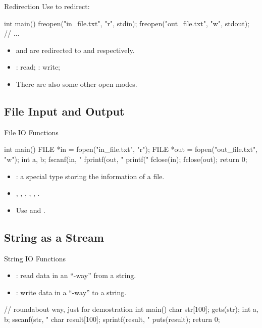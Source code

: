 \documentclass{beamer}
\begin{document}
\begin{frame}[fragile]{Redirection}
    Use  to redirect:
    \begin{cpp}
int main() {
  freopen("in_file.txt", "r", stdin);
  freopen("out_file.txt", "w", stdout);
  // ...
}
    \end{cpp}
    \pause
    \begin{itemize}
        \item {} and  are redirected to  and  respectively.
        \item {}: read; : write;
        \item There are also some other open modes.
    \end{itemize}
\end{frame}

\subsection{File Input and Output}

\begin{frame}[fragile]{File IO Functions}
    \begin{cpp}
int main() {
  FILE *in = fopen("in_file.txt", "r");
  FILE *out = fopen("out_file.txt", "w");
  int a, b;
  fscanf(in, "%
  fprintf(out, "%
  printf("%
  fclose(in);
  fclose(out);
  return 0;
}
    \end{cpp}
    \begin{itemize}
        \item {}: a special type storing the information of a file.
        \item {}, , , , , .
        \item Use  and .
    \end{itemize}
\end{frame}

\subsection{String as a Stream}

\begin{frame}[fragile]{String IO Functions}
    \begin{itemize}
        \item {}: read data in an ``-way'' from a string.
        \item {}: write data in a ``-way'' to a string.
    \end{itemize}
    \begin{cpp}
// roundabout way, just for demostration
int main() {
  char str[100];
  gets(str);
  int a, b;
  sscanf(str, "%
  char result[100];
  sprintf(result, "%
  puts(result);
  return 0;
}
    \end{cpp}
\end{frame}
\end{document}
